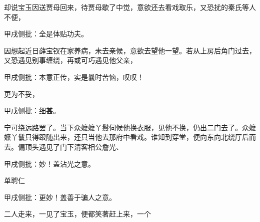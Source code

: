 \begin{parag}
    却说宝玉因送贾母回来，待贾母歇了中觉，意欲还去看戏取乐，又恐扰的秦氏等人不便，\begin{note}甲戌侧批：全是体贴功夫。\end{note}因想起近日薛宝钗在家养病，未去亲候，意欲去望他一望。若从上房后角门过去，又恐遇见别事缠绕，再或可巧遇见他父亲，\begin{note}甲戌侧批：本意正传，实是曩时苦恼，叹叹！\end{note}更为不妥，\begin{note}甲戌侧批：细甚。\end{note}宁可绕远路罢了。当下众嬷嬷丫鬟伺候他换衣服，见他不换，仍出二门去了。众嬷嬷丫鬟只得跟随出来，还只当他去那府中看戏。谁知到穿堂，便向东向北绕厅后而去。偏顶头遇见了门下清客相公詹光、\begin{note}甲戌侧批：妙！盖沾光之意。\end{note}单聘仁\begin{note}甲戌侧批：更妙！盖善于骗人之意。\end{note}二人走来，一见了宝玉，便都笑著赶上来，一个
\end{parag}
